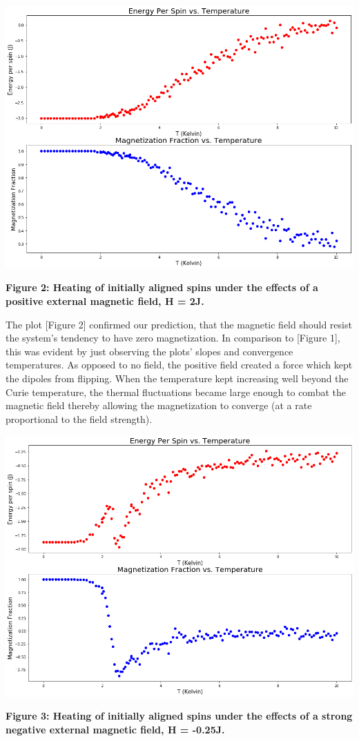 \documentclass[11pt]{article}
\begin{document}
\begin{center}
    \includegraphics[width = \linewidth]{alignedPosField.png}
    \caption{\textbf{Figure 2: Heating of initially aligned spins under the effects of a positive external magnetic field, H = 2J.}}
    \label{fig:plt1}
\end{center}

The plot [Figure 2] confirmed our prediction, that the magnetic field should resist the system's tendency to have zero magnetization. In comparison to [Figure 1], this was evident by just observing the plots' slopes and convergence temperatures. As opposed to no field, the positive field created a force which kept the dipoles from flipping. When the temperature kept increasing well beyond the Curie temperature, the thermal fluctuations became large enough to combat the magnetic field thereby allowing the magnetization to converge (at a rate proportional to the field strength).

\begin{center}
    \includegraphics[width = \linewidth]{alignedNegField.png}
    \caption{\textbf{Figure 3: Heating of initially aligned spins under the effects of a strong negative external magnetic field, H = -0.25J.}}
    \label{fig:plt1}
\end{center}
\end{document}
